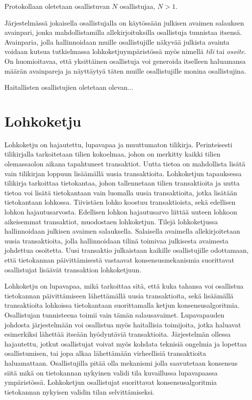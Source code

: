 Protokollaan oletetaan osallistuvan $N$ osallistujaa, $N > 1$.

Järjestelmässä jokaisella osallistujalla on käytössään julkisen avaimen salauksen avainpari, jonka mahdollistamilla allekirjoituksilla osallistuja tunnistaa itsensä. Avainparia, jolla hallinnoidaan muille osallistujille näkyvää julkista avainta voidaan kutsua tutkielmassa lohkoketjuympäristössä myös nimellä \textit{tili} tai \textit{osoite}. On huomioitavaa, että yksittäinen osallistuja voi generoida itselleen haluamansa määrän avainpareja ja näyttäytyä täten muille osallistujille monina osallistujina.

Haitallisten osallistujien oletetaan olevan...

\section{Lohkoketju}

Lohkoketju on hajautettu, lupavapaa ja muuttumaton tilikirja. Perinteisesti tilikirjalla tarkoitetaan tilien kokoelmaa, johon on merkitty kaikki tilien olemassaolon aikana tapahtuneet transaktiot. Uutta tietoa on mahdollista lisätä vain tilikirjan loppuun lisäämällä uusia transaktioita. Lohkoketjun tapauksessa tilikirja tarkoittaa tietokantaa, johon tallennetaan tilien transaktioita ja uutta tietoa voi lisätä tietokantaan vain luomalla uusia transaktioita, jotka lisätään tietokantaan lohkossa. Tiivistäen lohko koostuu transaktioista, sekä edellisen lohkon hajautusarvosta. Edellisen lohkon hajautusarvo liittää uuteen lohkoon aikeisemmat transaktiot, muodostaen lohkoketjun. Tilejä lohkoketjussa hallinnoidaan julkisen avaimen salauksella. Salaisella avaimella allekirjoitetaan uusia transaktioita, jolla hallinnoidaan tilinä toimivaa julkisesta avaimesta johdettua osoitetta. Uusi transaktio julkaistaan kaikille osallistujille odottamaan, että tietokannan päivittämisestä vastaavat konsensusmekanismia suorittavat osallistujat lisäävät transaktion lohkoketjuun.

Lohkoketju on lupavapaa, mikä tarkoittaa sitä, että kuka tahansa voi osallistua tietokannan päivittämiseen lähettämällä uusia transaktioita, sekä lisäämällä transaktioita lohkoissa tietokantaan suorittamalla ketjun konsensusalgoritmia. Osallistujan tunnisteena toimii vain tämän salausavaimet. Lupavapauden johdosta järjestelmään voi osallistua myös haitallisia toimijoita, jotka haluavat esimerkiksi lähettää itseään hyödyntäviä transaktioita. Järjestelmän ollessa hajautettu, jotkut osallistujat voivat myös kohdata teknisiä ongelmia ja lopettaa osallistumisen, tai jopa alkaa lähettämään virheellisiä transaktioita haluamattaan. Osallistujilla pitää olla mekanismi jolla saavutetaan konsensus siitä mikä on tietokannan nykyinen validi tila kuvaillussa lupavapaassa ympäristössä. Lohkoketjun osallistujat suorittavat konsensusalgoritmia tietokannan nykyisen validin tilan selvittämiseksi. 

